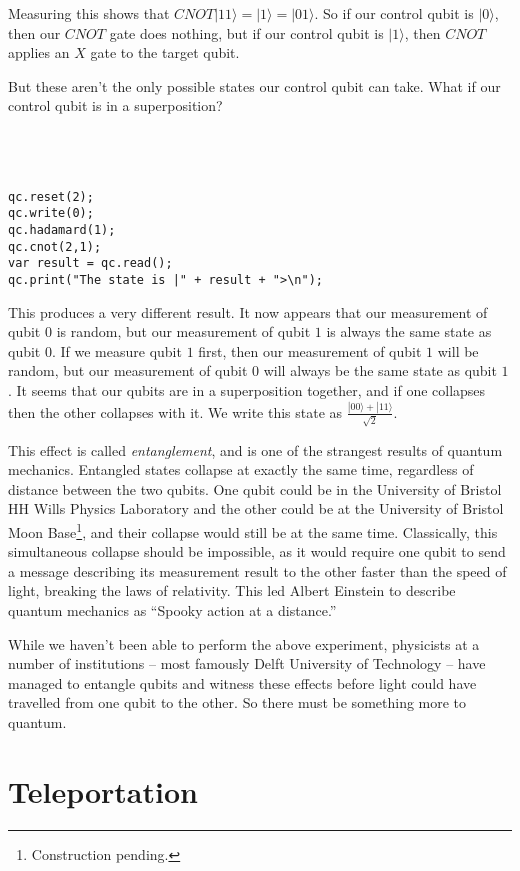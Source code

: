 \documentclass[twocolumn]{article}
\begin{document}
Measuring this shows that $CNOT|11\rangle = |1\rangle = |01\rangle$. So if our control qubit is $|0\rangle$, then our $CNOT$ gate does nothing, but if our control qubit is $|1\rangle$, then $CNOT$ applies an $X$ gate to the target qubit.

But these aren't the only possible states our control qubit can take. What if our control qubit is in a superposition?
\\\\\\\\
\begin{lstlisting}
qc.reset(2);
qc.write(0);
qc.hadamard(1);
qc.cnot(2,1);
var result = qc.read();
qc.print("The state is |" + result + ">\n");
\end{lstlisting}

This produces a very different result. It now appears that our measurement of qubit $0$ is random, but our measurement of qubit $1$ is always the same state as qubit $0$. If we measure qubit $1$ first, then our measurement of qubit $1$ will be random, but our measurement of qubit $0$ will always be the same state as qubit $1$. It seems that our qubits are in a superposition together, and if one collapses then the other collapses with it. We write this state as $\frac{|00\rangle + |11\rangle}{\sqrt{2}}$.

This effect is called {\em entanglement}, and is one of the strangest results of quantum mechanics. Entangled states collapse at exactly the same time, regardless of distance between the two qubits. One qubit could be in the University of Bristol HH Wills Physics Laboratory and the other could be at the University of Bristol Moon Base\footnote{Construction pending.}, and their collapse would still be at the same time. Classically, this simultaneous collapse should be impossible, as it would require one qubit to send a message describing its measurement result to the other faster than the speed of light, breaking the laws of relativity. This led Albert Einstein to describe quantum mechanics as ``Spooky action at a distance.''

While we haven't been able to perform the above experiment, physicists at a number of institutions -- most famously Delft University of Technology -- have managed to entangle qubits and witness these effects before light could have travelled from one qubit to the other. So there must be something more to quantum.

\section{Teleportation}
\end{document}
